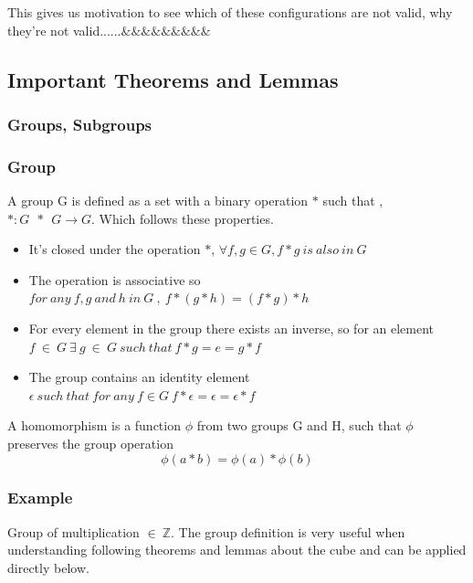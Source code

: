 \documentclass{article}
\begin{document}
This gives us motivation to see which of these configurations are not valid, why they're not valid......$\&\&\&\&\&\&\&\&\&$

\paragraph*{}


\subsection{Important Theorems and Lemmas}

\paragraph*{}
\subsubsection{Groups, Subgroups}

\subsubsection*{Group}
 
A group G is defined as a set with a binary operation $*$ such that , $* : G \ \ *\ \ G \rightarrow G$.
Which follows these properties.
\begin{itemize}
	\item It's closed under the operation $*$,  $\forall f, g \in G , f*g\ is\ also\ in \ G$
    \item The operation is associative so $for\ any\ f, g\ and\  h\ in\  G\ ,\  f*(g*h) = (f*g)*h$
    \item For every element in the group there exists an inverse, so for an element $ f\ \in\ G\ \exists\ g\ \in\ G\ such\ that\ f*g=e=g*f$
    \item The group contains an identity element $\epsilon \ such\ that\ for\ any\ f \in G\ f*\epsilon=\epsilon=\epsilon *f$
\end{itemize}

A homomorphism is a function $\phi $ from two groups G and H,  such that $\phi$ preserves the group operation 
\begin{equation}
	\phi(a*b)= \phi(a) * \phi(b)
\end{equation}

\subsubsection{Example}
Group of multiplication $\in \ \mathbb{Z}$.
\newline The group definition is very useful when understanding following theorems and lemmas about the cube and can be applied directly below.
\end{document}
